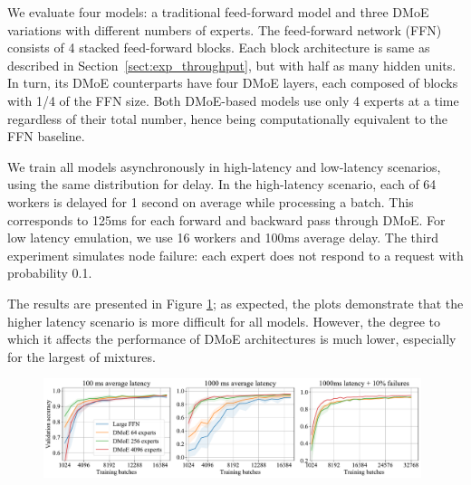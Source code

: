 We evaluate four models: a traditional feed-forward model and three DMoE variations with different numbers of experts. The feed-forward network (FFN) consists of 4 stacked feed-forward blocks. Each block architecture is same as described in Section~\ref{sect:exp_throughput}, but with half as many hidden units. In turn, its DMoE counterparts have four DMoE layers, each composed of blocks with 1/4 of the FFN size. Both DMoE-based models use only 4 experts at a time regardless of their total number, hence being computationally equivalent to the FFN baseline.

We train all models asynchronously in high-latency and low-latency scenarios, using the same distribution for delay. In the high-latency scenario, each of 64 workers is delayed for 1 second on average while processing a batch. This corresponds to 125ms for each forward and backward pass through DMoE. For low latency emulation, we use 16 workers and 100ms average delay. The third experiment simulates node failure: each expert does not respond to a request with probability 0.1.

The results are presented in Figure \ref{fig:convergence_mnist}; as expected, the plots demonstrate that the higher latency scenario is more difficult for all models. However, the degree to which it affects the performance of DMoE architectures is much lower, especially for the largest of mixtures.

\begin{figure}[h]
\vspace{-6px}
    \begin{minipage}{0.99\textwidth}
        \hspace{-16px}\includegraphics[width=417px]{resources/convergence.pdf}
    \end{minipage}
    \vspace{-4px}
    \label{fig:convergence_mnist}
\end{figure}

\vspace{-4px}

